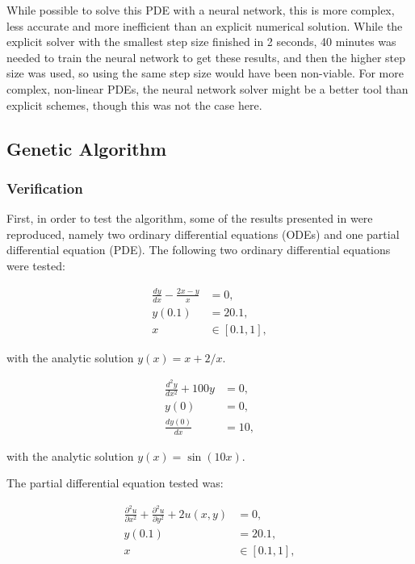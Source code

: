\documentclass[multicolumn, 9pt]{extarticle}
\begin{document}
While possible to solve this PDE with a neural network, this is more complex, less accurate and more inefficient than an explicit numerical solution. While the explicit solver with the smallest step size finished in 2 seconds, 40 minutes was needed to train the neural network to get these results, and then the higher step size was used, so using the same step size would have been non-viable. For more complex, non-linear PDEs, the neural network solver might be a better tool than explicit schemes, though this was not the case here.

\subsection{Genetic Algorithm}
\subsubsection{Verification}
First, in order to test the algorithm, some of the results presented in \cite{Lagaris} were reproduced, namely two ordinary differential equations (ODEs) and one partial differential equation (PDE). The following two ordinary differential equations were tested:

\begin{align*}
	\frac{dy}{dx}  - \frac{2x - y}{x} & = 0,          \\
	y(0.1)                            & = 20.1,       \\
	x                                 & \in [0.1, 1],
\end{align*}

with the analytic solution $y(x) = x + 2/x$.

\begin{equation}
	\begin{aligned}
		\label{eq:ODE}
		\frac{d^{2}y}{dx^{2}}  + 100y & = 0,  \\
		y(0)                          & = 0,  \\
		\frac{dy(0)}{dx}              & = 10,
	\end{aligned}
\end{equation}

with the analytic solution $y(x) = \sin(10x)$.

The partial differential equation tested was:

\begin{equation}
	\begin{aligned}
		\label{eq:PDE}
		\frac{\partial^{2}u}{\partial x^{2}} + \frac{\partial^{2}u}{\partial y^{2}} + 2u(x, y) & = 0,          \\
		y(0.1)                                                                                 & = 20.1,       \\
		x                                                                                      & \in [0.1, 1],
	\end{aligned}
\end{equation}
\end{document}
